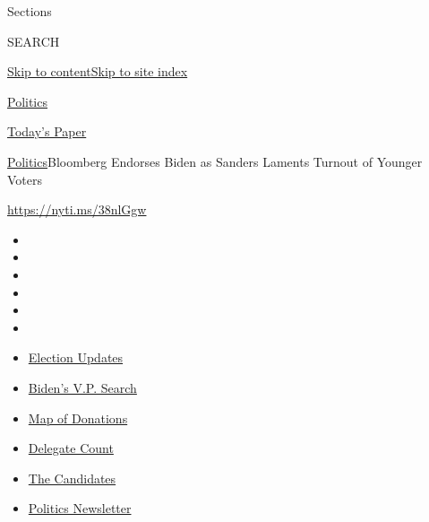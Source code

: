 Sections

SEARCH

\protect\hyperlink{site-content}{Skip to
content}\protect\hyperlink{site-index}{Skip to site index}

\href{https://www.nytimes.com/section/politics}{Politics}

\href{https://myaccount.nytimes.com/auth/login?response_type=cookie\&client_id=vi}{}

\href{https://www.nytimes.com/section/todayspaper}{Today's Paper}

\href{/section/politics}{Politics}\textbar{}Bloomberg Endorses Biden as
Sanders Laments Turnout of Younger Voters

\url{https://nyti.ms/38nlGgw}

\begin{itemize}
\item
\item
\item
\item
\item
\item
\end{itemize}

\begin{itemize}
\item
  \href{https://www.nytimes.com/2020/07/31/us/elections/biden-vs-trump.html?action=click\&pgtype=Article\&state=default\&region=TOP_BANNER\&context=storylines_menu}{Election
  Updates}
\item
  \href{https://www.nytimes.com/article/biden-vice-president-2020.html?action=click\&pgtype=Article\&state=default\&region=TOP_BANNER\&context=storylines_menu}{Biden's
  V.P. Search}
\item
  \href{https://www.nytimes.com/interactive/2020/07/24/us/politics/trump-biden-campaign-donors.html?action=click\&pgtype=Article\&state=default\&region=TOP_BANNER\&context=storylines_menu}{Map
  of Donations}
\item
  \href{https://www.nytimes.com/interactive/2020/us/elections/delegate-count-primary-results.html?action=click\&pgtype=Article\&state=default\&region=TOP_BANNER\&context=storylines_menu}{Delegate
  Count}
\item
  \href{https://www.nytimes.com/interactive/2019/us/politics/2020-presidential-candidates.html?action=click\&pgtype=Article\&state=default\&region=TOP_BANNER\&context=storylines_menu}{The
  Candidates}
\item
  \href{https://www.nytimes.com/newsletters/politics?action=click\&pgtype=Article\&state=default\&region=TOP_BANNER\&context=storylines_menu}{Politics
  Newsletter}
\end{itemize}

